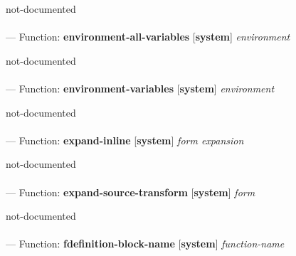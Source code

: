 \begin{adjustwidth}{5em}{5em}
not-documented
\end{adjustwidth}

\paragraph{}
\label{SYSTEM:ENVIRONMENT-ALL-VARIABLES}
--- Function: \textbf{environment-all-variables} [\textbf{system}] \textit{environment}

\begin{adjustwidth}{5em}{5em}
not-documented
\end{adjustwidth}

\paragraph{}
\label{SYSTEM:ENVIRONMENT-VARIABLES}
--- Function: \textbf{environment-variables} [\textbf{system}] \textit{environment}

\begin{adjustwidth}{5em}{5em}
not-documented
\end{adjustwidth}

\paragraph{}
\label{SYSTEM:EXPAND-INLINE}
--- Function: \textbf{expand-inline} [\textbf{system}] \textit{form expansion}

\begin{adjustwidth}{5em}{5em}
not-documented
\end{adjustwidth}

\paragraph{}
\label{SYSTEM:EXPAND-SOURCE-TRANSFORM}
--- Function: \textbf{expand-source-transform} [\textbf{system}] \textit{form}

\begin{adjustwidth}{5em}{5em}
not-documented
\end{adjustwidth}

\paragraph{}
\label{SYSTEM:FDEFINITION-BLOCK-NAME}
--- Function: \textbf{fdefinition-block-name} [\textbf{system}] \textit{function-name}

